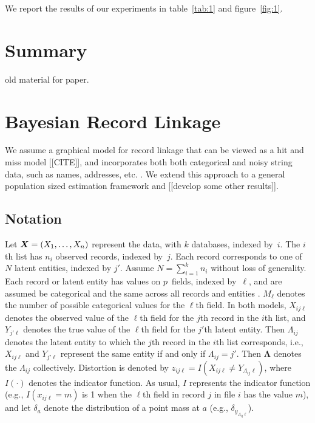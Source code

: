 \documentclass[twoside]{article}
\begin{document}
We report the results of our experiments in table~\ref{tab:1} and
figure~\ref{fig:1}. 


\section{Summary}
\label{sec:disc}



\newpage

old material for paper. 
 
\vspace{-2mm}
\section{Bayesian Record Linkage}
\label{sec:background}
We assume a graphical model for record linkage that can be viewed as a hit and miss model [[CITE]], and incorporates both both categorical and noisy string data, such as names, addresses, etc. \cite{steorts15entity}. We extend this approach to a general population sized estimation framework and [[develop some other results]]. 


\subsection{Notation}
\label{sec:notation}

{Let $\bm{X}=(X_1,\ldots,X_n)$} represent the data, with $k$ databases, indexed by~$i$.  The $i$th list has $n_i$ observed records, indexed by~$j$.  Each record corresponds to one of $N$ latent entities, indexed by $j'.$ Assume
 $N=\sum_{i=1}^k n_i$ without loss of generality.
Each record or latent entity has values on $p$~fields, indexed by~$\ell$, and are assumed  be categorical and the same across all records and entities \cite{steorts14smered,steorts??bayesian}.
$M_\ell$ denotes the number of possible categorical values for the $\ell$th field.
%
In both models, $X_{ij\ell}$ denotes the
observed value of the $\ell$th field for the $j$th record in the $i$th list,
and $Y_{j'\ell}$ denotes the true value of the $\ell$th field for the $j'$th latent
entity. Then $\Lambda_{ij}$ denotes the latent entity to which the
$j$th record in the $i$th list corresponds, i.e., $X_{ij\ell}$ and $Y_{j'\ell}$
represent the same entity if and only if $\Lambda_{ij}=j'$.
%
Then $\bm\Lambda$ denotes the $\Lambda_{ij}$ collectively.
Distortion is denoted by $z_{ij\ell}=I(X_{ij\ell}\ne Y_{\Lambda_{ij}\ell})$,
where $I(\cdot)$ denotes the indicator function.
As usual,  $I$ represents the indicator function (e.g., $I(x_{ij\ell}=m)$ is 1 when
the $\ell$th field in record $j$ in file $i$ has the value $m$),
and let $\delta_a$ denote the distribution of a point mass at $a$ (e.g., $\delta_{y_{\Lambda_{ij}\ell}}$). 
\end{document}
